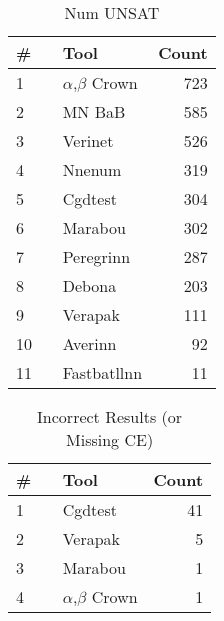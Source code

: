 
\begin{table}[h]
\begin{center}
\caption{Num UNSAT} \label{tab:stats3}
{\setlength{\tabcolsep}{2pt}
\begin{tabular}[h]{@{}llr@{}}
\toprule
\textbf{\# ~} & \textbf{Tool} & \textbf{Count}\\
\midrule
1 & $\alpha$,$\beta$ Crown & 723 \\
2 & MN BaB & 585 \\
3 & Verinet & 526 \\
4 & Nnenum & 319 \\
5 & Cgdtest & 304 \\
6 & Marabou & 302 \\
7 & Peregrinn & 287 \\
8 & Debona & 203 \\
9 & Verapak & 111 \\
10 & Averinn & 92 \\
11 & Fastbatllnn & 11 \\
\bottomrule
\end{tabular}
}
\end{center}
\end{table}




\begin{table}[h]
\begin{center}
\caption{Incorrect Results (or Missing CE)} \label{tab:stats4}
{\setlength{\tabcolsep}{2pt}
\begin{tabular}[h]{@{}llr@{}}
\toprule
\textbf{\# ~} & \textbf{Tool} & \textbf{Count}\\
\midrule
1 & Cgdtest & 41 \\
2 & Verapak & 5 \\
3 & Marabou & 1 \\
4 & $\alpha$,$\beta$ Crown & 1 \\
\bottomrule
\end{tabular}
}
\end{center}
\end{table}


